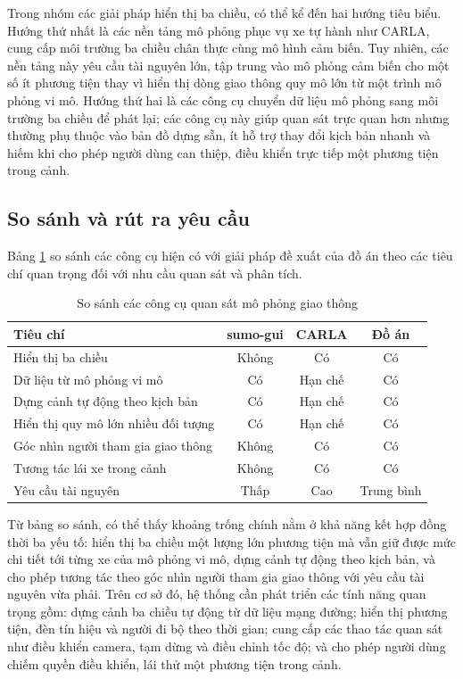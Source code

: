 ﻿\documentclass[../DoAn.tex]{subfiles}
\begin{document}
Trong nhóm các giải pháp hiển thị ba chiều, có thể kể đến hai hướng tiêu biểu.
Hướng thứ nhất là các nền tảng mô phỏng phục vụ xe tự hành như CARLA, cung cấp
môi trường ba chiều chân thực cùng mô hình cảm biến. Tuy nhiên, các nền tảng này
yêu cầu tài nguyên lớn, tập trung vào mô phỏng cảm biến cho một số ít phương tiện
thay vì hiển thị dòng giao thông quy mô lớn từ một trình mô phỏng vi mô. Hướng
thứ hai là các công cụ chuyển dữ liệu mô phỏng sang môi trường ba chiều để phát
lại; các công cụ này giúp quan sát trực quan hơn nhưng thường phụ thuộc vào bản
đồ dựng sẵn, ít hỗ trợ thay đổi kịch bản nhanh và hiếm khi cho phép người dùng
can thiệp, điều khiển trực tiếp một phương tiện trong cảnh.

\subsection{So sánh và rút ra yêu cầu}

Bảng \ref{tab:khaosat-sosanh} so sánh các công cụ hiện có với giải pháp đề xuất
của đồ án theo các tiêu chí quan trọng đối với nhu cầu quan sát và phân tích.

\begin{table}[H]
	\centering
	\caption{So sánh các công cụ quan sát mô phỏng giao thông}
	\label{tab:khaosat-sosanh}
	\begin{tabular}{|p{}|c|c|c|}
		\hline
		\textbf{Tiêu chí} & \textbf{sumo-gui} & \textbf{CARLA} & \textbf{Đồ án} \\
		\hline
		Hiển thị ba chiều & Không & Có & Có \\ \hline
		Dữ liệu từ mô phỏng vi mô & Có & Hạn chế & Có \\ \hline
		Dựng cảnh tự động theo kịch bản & Có & Hạn chế & Có \\ \hline
		Hiển thị quy mô lớn nhiều đối tượng & Có & Hạn chế & Có \\ \hline
		Góc nhìn người tham gia giao thông & Không & Có & Có \\ \hline
		Tương tác lái xe trong cảnh & Không & Có & Có \\ \hline
		Yêu cầu tài nguyên & Thấp & Cao & Trung bình \\
		\hline
	\end{tabular}
\end{table}

Từ bảng so sánh, có thể thấy khoảng trống chính nằm ở khả năng kết hợp đồng thời
ba yếu tố: hiển thị ba chiều một lượng lớn phương tiện mà vẫn giữ được mức chi
tiết tới từng xe của mô phỏng vi mô, dựng cảnh tự động theo kịch bản, và cho phép
tương tác theo góc nhìn người tham gia giao thông với yêu cầu tài nguyên vừa
phải. Trên cơ sở đó, hệ thống cần phát triển các tính năng
quan trọng gồm: dựng cảnh ba chiều tự động từ dữ liệu mạng đường; hiển thị phương
tiện, đèn tín hiệu và người đi bộ theo thời gian; cung cấp các thao tác quan sát
như điều khiển camera, tạm dừng và điều chỉnh tốc độ; và cho phép người dùng
chiếm quyền điều khiển, lái thử một phương tiện trong cảnh.
\end{document}
